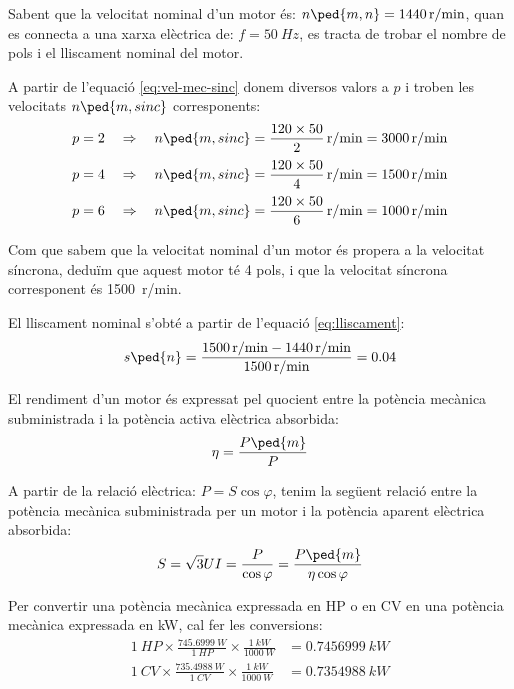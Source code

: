 	
\begin{exemple}[\MotorNombrePols{}]
	\addcontentsxms{\MotorNombrePols}
    Sabent que la velocitat nominal d'un motor és: $n\ped{m,n} = \qty{1440}{r/min}$, quan es connecta a una xarxa elèctrica de: $f = \qty{50}{Hz}$,  es tracta de trobar el nombre de pols i el lliscament nominal del motor.

    A partir de l'equació \eqref{eq:vel-mec-sinc} donem diversos valors a $p$ i troben les velocitats $n\ped{m,sinc}$ corresponents:
    \begin{align*}
      p = 2 \quad  &\Rightarrow \quad n\ped{m,sinc} = \frac{120 \times 50}{2} \, \unit{r/min} = \qty{3000}{r/min}\\[0.5ex]
      p = 4 \quad  &\Rightarrow \quad n\ped{m,sinc} = \frac{120 \times 50}{4} \, \unit{r/min} = \qty{1500}{r/min}\\[0.5ex]
      p = 6 \quad  &\Rightarrow \quad n\ped{m,sinc} = \frac{120 \times 50}{6} \, \unit{r/min} = \qty{1000}{r/min}
    \end{align*}

    Com que sabem que la velocitat nominal d'un motor és propera a la velocitat síncrona, deduïm que aquest motor té 4 pols, i que la velocitat síncrona corresponent és \qty{1500}{r/min}.

    El lliscament nominal s'obté a partir de l'equació \eqref{eq:lliscament}:
    \[
      s\ped{n} = \frac{\qty{1500}{r/min} - \qty{1440}{r/min}}{\qty{1500}{r/min}} = \num{0,04}
    \]
\end{exemple}

El rendiment d'un motor és expressat pel quocient entre la potència mecànica subministrada i la potència activa elèctrica absorbida:
\begin{equation}\index{rendiment}\index{potència!mecànica}
    \eta = \frac{P\ped{m}}{P}
\end{equation}

A partir de la relació elèctrica: $P = S \cos\varphi$, tenim la següent relació entre la potència mecànica subministrada per un motor i la potència aparent elèctrica absorbida:
\begin{equation}
    S = \sqrt{3} U I = \frac{P}{\cos\varphi} = \frac{P\ped{m}}{\eta \cos\varphi}\label{eq:mot-S-Pm}
\end{equation}

Per  convertir una potència mecànica expressada en HP o en CV en una  potència mecànica expressada en kW, cal  fer les conversions:
\begin{subequations}
\begin{align}
  \qty{1}{HP} \times \frac{\qty{745,6999}{W}}{\qty{1}{HP}} \times \frac{\qty{1}{kW}}{\qty{1000}{W}} &= \qty{0,7456999}{kW} \\[1ex]
  \qty{1}{CV} \times \frac{\qty{735,4988}{W}}{\qty{1}{CV}} \times \frac{\qty{1}{kW}}{\qty{1000}{W}} &= \qty{0,7354988}{kW}
\end{align}
\end{subequations}

